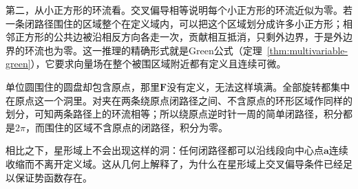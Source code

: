 第二，从小正方形的环流看。交叉偏导相等说明每个小正方形的环流近似为零。若一条闭路径围住的区域整个在定义域内，可以把这个区域划分成许多小正方形；相邻正方形的公共边被沿相反方向各走一次，贡献相互抵消，只剩外边界，于是外边界的环流也为零。这一推理的精确形式就是Green公式（定理~\ref{thm:multivariable-green}），它要求向量场在整个被围区域附近都有定义且连续可微。

单位圆围住的圆盘却包含原点，那里$\bm F$没有定义，无法这样填满。全部旋转都集中在原点这一个洞里。对夹在两条绕原点闭路径之间、不含原点的环形区域作同样的划分，可知两条路径上的环流相等；所以绕原点逆时针一周的简单闭路径，积分都是$2\pi$，而围住的区域不含原点的闭路径，积分为零。

相比之下，星形域上不会出现这样的洞：任何闭路径都可以沿线段向中心点$\bm a$连续收缩而不离开定义域。这从几何上解释了，为什么在星形域上交叉偏导条件已经足以保证势函数存在。

\FloatBarrier
